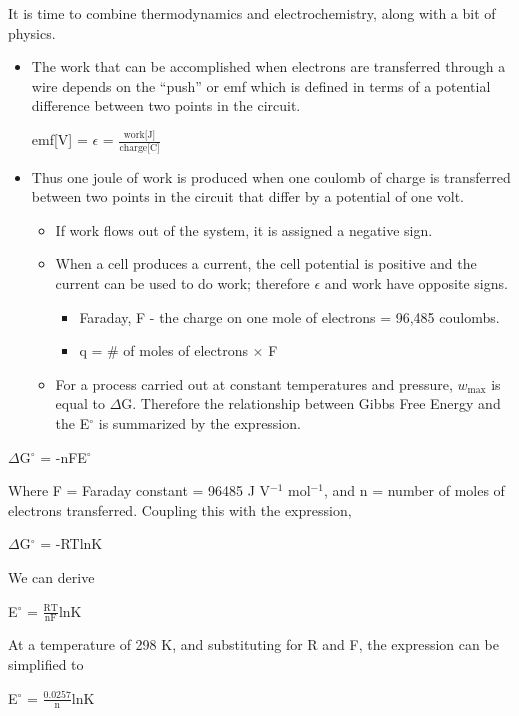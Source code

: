 \documentclass[../chem.tex]{subfiles}
\begin{document}
It is time to combine thermodynamics and electrochemistry, along with a bit of physics.
\begin{itemize}
    \item The work that can be accomplished when electrons are transferred through a wire depends on the ``push'' or emf which is defined in terms of a potential difference between two points in the circuit.
    \begin{center}
        emf[V] = $\epsilon$ = $\frac{\text{work[J]}}{\text{charge[C]}}$
    \end{center}
    \item Thus one joule of work is produced when one coulomb of charge is transferred between two points in the circuit that differ by a potential of one volt.
    \begin{itemize}
        \item If work flows out of the system, it is assigned a negative sign.
        \item When a cell produces a current, the cell potential is positive and the current can be used to do work; therefore $\epsilon$ and work have opposite signs.
        \begin{itemize}
            \item Faraday, F - the charge on one mole of electrons = 96,485 coulombs.
            \item q = \# of moles of electrons $\times$ F
        \end{itemize}
        \item For a process carried out at constant temperatures and pressure, $w_{\text{max}}$ is equal to $\Delta$G. Therefore the relationship between Gibbs Free Energy and the E$^{\circ}$ is summarized by the expression.
    \end{itemize}
\end{itemize}
\begin{center}
    $\Delta$G$^{\circ}$ = -nFE$^{\circ}$
\end{center}

Where F = Faraday constant = 96485 J V$^{-1}$ mol$^{-1}$, and n = number of moles of electrons transferred. Coupling this with the expression,
\begin{center}
    $\Delta$G$^{\circ}$ = -RTlnK
\end{center}
We can derive
\begin{center}
    E$^{\circ}$ = $\frac{\text{RT}}{\text{nF}}$lnK 
\end{center}
At a temperature of 298 K, and substituting for R and F, the expression can be simplified to 
\begin{center}
    E$^{\circ}$ = $\frac{0.0257}{\text{n}}$lnK 
\end{center}
\end{document}
